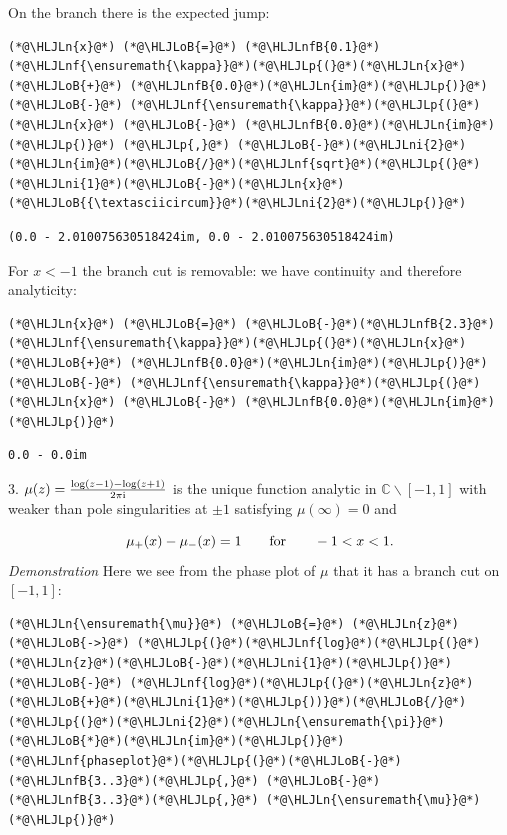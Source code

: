 \documentclass[12pt,a4paper]{article}
\newcommand{\HLJLn}[1]{#1}
\newcommand{\HLJLnf}[1]{\textcolor[RGB]{66,102,213}{#1}}
\newcommand{\HLJLnfB}[1]{\textcolor[RGB]{59,151,46}{#1}}
\newcommand{\HLJLni}[1]{\textcolor[RGB]{59,151,46}{#1}}
\newcommand{\HLJLoB}[1]{\textcolor[RGB]{102,102,102}{\textbf{#1}}}
\newcommand{\HLJLp}[1]{#1}
\def\qqfor{\qquad\hbox{for}\qquad}
\def\I{ {\rm i} }
\def\C{ {\mathbb C} }
\def\qqfor{\qquad\hbox{for}\qquad}
\begin{document}
On the branch there is the expected jump:


\begin{lstlisting}
(*@\HLJLn{x}@*) (*@\HLJLoB{=}@*) (*@\HLJLnfB{0.1}@*)
(*@\HLJLnf{\ensuremath{\kappa}}@*)(*@\HLJLp{(}@*)(*@\HLJLn{x}@*) (*@\HLJLoB{+}@*) (*@\HLJLnfB{0.0}@*)(*@\HLJLn{im}@*)(*@\HLJLp{)}@*) (*@\HLJLoB{-}@*) (*@\HLJLnf{\ensuremath{\kappa}}@*)(*@\HLJLp{(}@*)(*@\HLJLn{x}@*) (*@\HLJLoB{-}@*) (*@\HLJLnfB{0.0}@*)(*@\HLJLn{im}@*)(*@\HLJLp{)}@*) (*@\HLJLp{,}@*) (*@\HLJLoB{-}@*)(*@\HLJLni{2}@*)(*@\HLJLn{im}@*)(*@\HLJLoB{/}@*)(*@\HLJLnf{sqrt}@*)(*@\HLJLp{(}@*)(*@\HLJLni{1}@*)(*@\HLJLoB{-}@*)(*@\HLJLn{x}@*)(*@\HLJLoB{{\textasciicircum}}@*)(*@\HLJLni{2}@*)(*@\HLJLp{)}@*)
\end{lstlisting}

\begin{lstlisting}
(0.0 - 2.010075630518424im, 0.0 - 2.010075630518424im)
\end{lstlisting}


For $x < -1$ the branch cut is removable: we have continuity and therefore analyticity:


\begin{lstlisting}
(*@\HLJLn{x}@*) (*@\HLJLoB{=}@*) (*@\HLJLoB{-}@*)(*@\HLJLnfB{2.3}@*)
(*@\HLJLnf{\ensuremath{\kappa}}@*)(*@\HLJLp{(}@*)(*@\HLJLn{x}@*) (*@\HLJLoB{+}@*) (*@\HLJLnfB{0.0}@*)(*@\HLJLn{im}@*)(*@\HLJLp{)}@*) (*@\HLJLoB{-}@*) (*@\HLJLnf{\ensuremath{\kappa}}@*)(*@\HLJLp{(}@*)(*@\HLJLn{x}@*) (*@\HLJLoB{-}@*) (*@\HLJLnfB{0.0}@*)(*@\HLJLn{im}@*)(*@\HLJLp{)}@*)
\end{lstlisting}

\begin{lstlisting}
0.0 - 0.0im
\end{lstlisting}


3. $\mu(z) = {\log(z -1) - \log(z+1) \over 2 \pi \I}$ is the unique function analytic in $\C \backslash [-1,1]$ with weaker than pole singularities at $\pm 1$ satisfying $\mu(\infty) = 0$ and 

\[
\mu_+(x) - \mu_-(x) = 1 \qqfor -1 < x < 1.
\]
\emph{Demonstration} Here we see from the phase plot of $\mu$ that it has a branch cut on $[-1,1]$:


\begin{lstlisting}
(*@\HLJLn{\ensuremath{\mu}}@*) (*@\HLJLoB{=}@*) (*@\HLJLn{z}@*) (*@\HLJLoB{->}@*) (*@\HLJLp{(}@*)(*@\HLJLnf{log}@*)(*@\HLJLp{(}@*)(*@\HLJLn{z}@*)(*@\HLJLoB{-}@*)(*@\HLJLni{1}@*)(*@\HLJLp{)}@*) (*@\HLJLoB{-}@*) (*@\HLJLnf{log}@*)(*@\HLJLp{(}@*)(*@\HLJLn{z}@*)(*@\HLJLoB{+}@*)(*@\HLJLni{1}@*)(*@\HLJLp{))}@*)(*@\HLJLoB{/}@*)(*@\HLJLp{(}@*)(*@\HLJLni{2}@*)(*@\HLJLn{\ensuremath{\pi}}@*)(*@\HLJLoB{*}@*)(*@\HLJLn{im}@*)(*@\HLJLp{)}@*)
(*@\HLJLnf{phaseplot}@*)(*@\HLJLp{(}@*)(*@\HLJLoB{-}@*)(*@\HLJLnfB{3..3}@*)(*@\HLJLp{,}@*) (*@\HLJLoB{-}@*)(*@\HLJLnfB{3..3}@*)(*@\HLJLp{,}@*) (*@\HLJLn{\ensuremath{\mu}}@*)(*@\HLJLp{)}@*)
\end{lstlisting}
\end{document}
